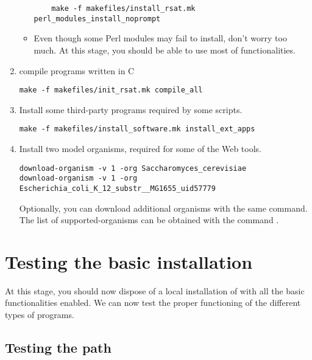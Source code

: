 \documentclass[12pt,a4paper, oneside]{scrreprt} %
\begin{document}
\begin{enumerate}
\begin{itemize}
\begin{lstlisting}
    make -f makefiles/install_rsat.mk perl_modules_install_noprompt
\end{lstlisting}
    
  \item Even though some Perl modules may fail to install, don't worry
    too much. At this stage, you should be able to use most of \RSAT
    functionalities.
  \end{itemize}

\item compile \RSAT programs written in C

\begin{lstlisting}
make -f makefiles/init_rsat.mk compile_all
\end{lstlisting}

\item Install some third-party programs required by some \RSAT
  scripts.

\begin{lstlisting}
make -f makefiles/install_software.mk install_ext_apps
\end{lstlisting}


\item Install two model organisms, required for some of the Web tools.

  \begin{lstlisting}
download-organism -v 1 -org Saccharomyces_cerevisiae
download-organism -v 1 -org Escherichia_coli_K_12_substr__MG1655_uid57779
  \end{lstlisting}
  
  Optionally, you can download additional organisms with the same
  command. The list of supported-organisms can be obtained with the
  command .

\end{enumerate}

\section{Testing the basic installation}

At this stage, you should now dispose of a local installation of \RSAT
with all the basic functionalities enabled. We can now test the proper
functioning of the different types of programs.

\subsection{Testing the path}
\end{document}

